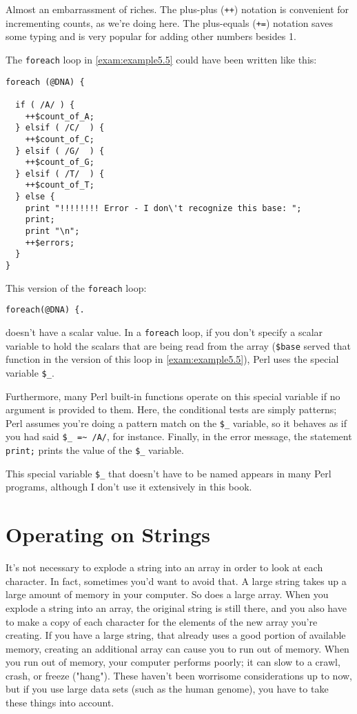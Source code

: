 Almost an embarrassment of riches. The plus-plus (\verb|++|) notation is convenient for incrementing counts, as we're doing here. The plus-equals (\verb|+=|) notation saves some typing and is very popular for adding other numbers besides 1.

The \verb|foreach| loop in \autoref{exam:example5.5} could have been written like this:

\begin{lstlisting}
foreach (@DNA) {
  
  if ( /A/ ) {
    ++$count_of_A;
  } elsif ( /C/  ) {
    ++$count_of_C;
  } elsif ( /G/  ) {
    ++$count_of_G;
  } elsif ( /T/  ) {
    ++$count_of_T;
  } else {
    print "!!!!!!!! Error - I don\'t recognize this base: ";
    print;
    print "\n";
    ++$errors;
  }
}
\end{lstlisting}

This version of the \verb|foreach| loop:

\begin{lstlisting}
foreach(@DNA) {.
\end{lstlisting}

doesn't have a scalar value. In a \verb|foreach| loop, if you don't specify a scalar variable to hold the scalars that are being read from the array (\verb|$base| served that function in the version of this loop in \autoref{exam:example5.5}), Perl uses the special variable \verb|$_|.

Furthermore, many Perl built-in functions operate on this special variable if no argument is provided to them. Here, the conditional tests are simply patterns; Perl assumes you're doing a pattern match on the \verb|$_| variable, so it behaves as if you had said \verb|$_ =~ /A/|, for instance.  Finally, in the error message, the statement \verb|print;| prints the value of the \verb|$_| variable.

This special variable \verb|$_| that doesn't have to be named appears in many Perl programs, although I don't use it extensively in this book. 

\section{Operating on Strings}
It's not necessary to explode a string into an array in order to look at each character. In fact, sometimes you'd want to avoid that. A large string takes up a large amount of memory in your computer. So does a large array. When you explode a string into an array, the original string is still there, and you also have to make a copy of each character for the elements of the new array you're creating. If you have a large string, that already uses a good portion of available memory, creating an additional array can cause you to run out of memory. When you run out of memory, your computer performs poorly; it can slow to a crawl, crash, or freeze ("hang"). These haven't been worrisome considerations up to now, but if you use large data sets (such as the human genome), you have to take these things into account.

